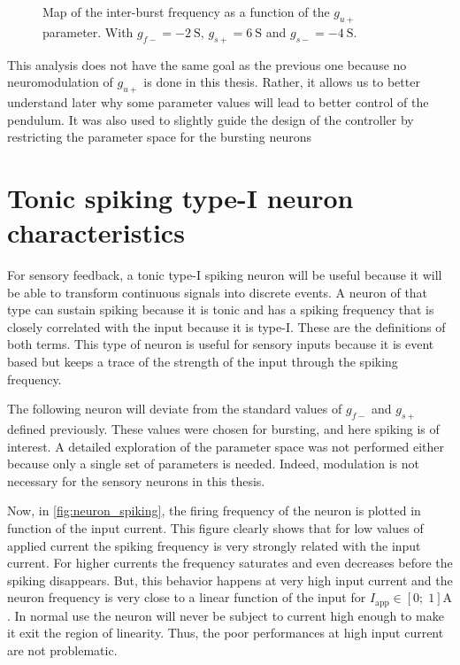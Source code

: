 \begin{figure}[!htb]
    \centering
    \caption{Map of the inter-burst frequency as a function of the $g_{u+}$ parameter. With $g_{f-} = \qty{-2}{\siemens}$, $g_{s+} = \qty{6}{\siemens}$ and $g_{s-} = \qty{-4}{\siemens}$.}
    \label{fig:neuron_burst_freq}
\end{figure}

This analysis does not have the same goal as the previous one because no neuromodulation of $g_{u+}$ is done in this thesis.
Rather, it allows us to better understand later why some parameter values will lead to better control of the pendulum.
It was also used to slightly guide the design of the controller by restricting the parameter space for the bursting neurons

\section{Tonic spiking type-I neuron characteristics}

For sensory feedback, a tonic type-I spiking neuron will be useful because it will be able to transform continuous signals into discrete events.
A neuron of that type can sustain spiking because it is tonic and has a spiking frequency that is closely correlated with the input because it is type-I.
These are the definitions of both terms.
This type of neuron is useful for sensory inputs because it is event based but keeps a trace of the strength of the input through the spiking frequency.

The following neuron will deviate from the standard values of $g_{f-}$ and $g_{s+}$ defined previously.
These values were chosen for bursting, and here spiking is of interest.
A detailed exploration of the parameter space was not performed either because only a single set of parameters is needed.
Indeed, modulation is not necessary for the sensory neurons in this thesis.

Now, in \cref{fig:neuron_spiking}, the firing frequency of the neuron is plotted in function of the input current. 
This figure clearly shows that for low values of applied current the spiking frequency is very strongly related with the input current. 
For higher currents the frequency saturates and even decreases before the spiking disappears.
But, this behavior happens at very high input current and the neuron frequency is very close to a linear function of the input for $I_\text{app} \in \left[0;\;1\right]\unit{\ampere}$.
In normal use the neuron will never be subject to current high enough to make it exit the region of linearity.
Thus, the poor performances at high input current are not problematic.

